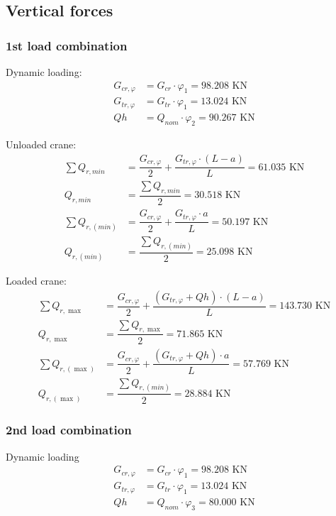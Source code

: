 \documentclass[a4paper,10pt, final, oneside, fleqn, onecolumn]{article}	%
\begin{document}
\subsection{Vertical forces}
\subsubsection{1st load combination}

Dynamic loading:
\begin{align*}
    G_{cr,φ} &= G_{cr} \cdot φ_1  = 98.208 \text{ KN} \\
    G_{tr,φ} &= G_{tr} \cdot φ_1  = 13.024 \text{ KN} \\
    Qh       &= Q_{nom} \cdot φ_2 = 90.267   \text{ KN}
\end{align*}

Unloaded crane:
\begin{align*}
    \sum{Q_{r,min}}   &= \dfrac{G_{cr,φ}}{2} + \dfrac{G_{tr,φ} \cdot (L - a)}{L} = 61.035 \text{ KN} \\
    Q_{r,min}         &= \dfrac{\displaystyle\sum{Q_{r,min}}}{2}                 = 30.518  \text{ KN} \\
    \sum{Q_{r,(min)}} &= \dfrac{G_{cr,φ}}{2} + \dfrac{G_{tr,φ} \cdot a}{L}       = 50.197 \text{ KN} \\
    Q_{r,(min)}       &= \dfrac{\displaystyle\sum{Q_{r,(min)}}}{2}               = 25.098  \text{ KN}
\end{align*}

Loaded crane:
\begin{align*}
    \sum{Q_{r,\max}}     &= \dfrac{G_{cr,φ}}{2} + \dfrac{(G_{tr,φ} + Qh) \cdot (L - a)}{L} = 143.730 \text{ KN} \\
    Q_{r,\max}           &= \dfrac{\displaystyle\sum{Q_{r,\max}}}{2}                       = 71.865  \text{ KN} \\
    \sum{Q_{r,(\max)}}   &= \dfrac{G_{cr,φ}}{2} + \dfrac{(G_{tr,φ} + Qh) \cdot a}{L}       = 57.769 \text{ KN} \\
    Q_{r,(\max)}         &= \dfrac{\displaystyle\sum{Q_{r,(min)}}}{2}                      = 28.884 \text{ KN}
\end{align*}

\subsubsection{2nd load combination}

Dynamic loading
\begin{align*}
    G_{cr,φ} &= G_{cr} \cdot φ_1  = 98.208 \text{ KN} \\
    G_{tr,φ} &= G_{tr} \cdot φ_1  = 13.024 \text{ KN} \\
    Qh       &= Q_{nom} \cdot φ_3 = 80.000   \text{ KN}
\end{align*}
\end{document}
